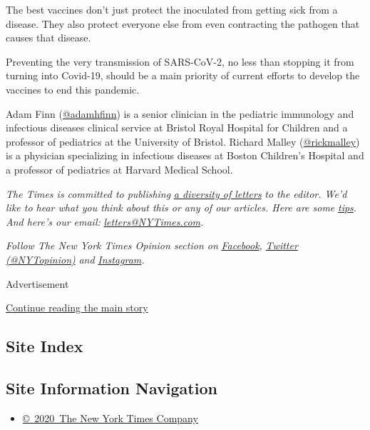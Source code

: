 The best vaccines don't just protect the inoculated from getting sick
from a disease. They also protect everyone else from even contracting
the pathogen that causes that disease.

Preventing the very transmission of SARS-CoV-2, no less than stopping it
from turning into Covid-19, should be a main priority of current efforts
to develop the vaccines to end this pandemic.

Adam Finn (\href{https://twitter.com/adamhfinn}{@adamhfinn}) is a senior
clinician in the pediatric immunology and infectious diseases clinical
service at Bristol Royal Hospital for Children and a professor of
pediatrics at the University of Bristol. Richard Malley
(\href{https://twitter.com/rickmalley}{@rickmalley}) is a physician
specializing in infectious diseases at Boston Children's Hospital and a
professor of pediatrics at Harvard Medical School.

\emph{The Times is committed to publishing}
\href{https://www.nytimes3xbfgragh.onion/2019/01/31/opinion/letters/letters-to-editor-new-york-times-women.html}{\emph{a
diversity of letters}} \emph{to the editor. We'd like to hear what you
think about this or any of our articles. Here are some}
\href{https://help.nytimes3xbfgragh.onion/hc/en-us/articles/115014925288-How-to-submit-a-letter-to-the-editor}{\emph{tips}}\emph{.
And here's our email:}
\href{mailto:letters@NYTimes.com}{\emph{letters@NYTimes.com}}\emph{.}

\emph{Follow The New York Times Opinion section on}
\href{https://www.facebookcorewwwi.onion/nytopinion}{\emph{Facebook}}\emph{,}
\href{http://twitter.com/NYTOpinion}{\emph{Twitter (@NYTopinion)}}
\emph{and}
\href{https://www.instagram.com/nytopinion/}{\emph{Instagram}}\emph{.}

Advertisement

\protect\hyperlink{after-bottom}{Continue reading the main story}

\hypertarget{site-index}{%
\subsection{Site Index}\label{site-index}}

\hypertarget{site-information-navigation}{%
\subsection{Site Information
Navigation}\label{site-information-navigation}}

\begin{itemize}
\tightlist
\item
  \href{https://help.nytimes3xbfgragh.onion/hc/en-us/articles/115014792127-Copyright-notice}{©~2020~The
  New York Times Company}
\end{itemize}

